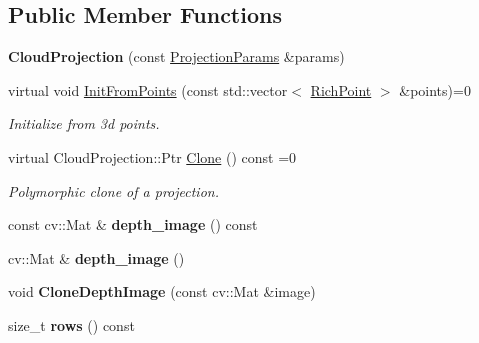 \subsection*{Public Member Functions}
\begin{DoxyCompactItemize}
\item 
\hypertarget{classdepth__clustering_1_1CloudProjection_a7abfd6e56bacd684379916af2ab60cef}{{\bfseries Cloud\-Projection} (const \hyperlink{classdepth__clustering_1_1ProjectionParams}{Projection\-Params} \&params)}\label{classdepth__clustering_1_1CloudProjection_a7abfd6e56bacd684379916af2ab60cef}

\item 
virtual void \hyperlink{classdepth__clustering_1_1CloudProjection_ad262ef9f4e0c9c7fab9cc37874ca72eb}{Init\-From\-Points} (const std\-::vector$<$ \hyperlink{classdepth__clustering_1_1RichPoint}{Rich\-Point} $>$ \&points)=0
\begin{DoxyCompactList}\small\item\em Initialize from 3d points. \end{DoxyCompactList}\item 
virtual Cloud\-Projection\-::\-Ptr \hyperlink{classdepth__clustering_1_1CloudProjection_ae06ff9699c1a37c535b39fa6f722fa2e}{Clone} () const =0
\begin{DoxyCompactList}\small\item\em Polymorphic clone of a projection. \end{DoxyCompactList}\item 
\hypertarget{classdepth__clustering_1_1CloudProjection_a5519c93050ed140d8baace3a625fd9ed}{const cv\-::\-Mat \& {\bfseries depth\-\_\-image} () const }\label{classdepth__clustering_1_1CloudProjection_a5519c93050ed140d8baace3a625fd9ed}

\item 
\hypertarget{classdepth__clustering_1_1CloudProjection_aa04e09c527c7e1bc1b5ab161c5931b30}{cv\-::\-Mat \& {\bfseries depth\-\_\-image} ()}\label{classdepth__clustering_1_1CloudProjection_aa04e09c527c7e1bc1b5ab161c5931b30}

\item 
\hypertarget{classdepth__clustering_1_1CloudProjection_a3e28dfda41fa497bfd54fe3c7f2a9b37}{void {\bfseries Clone\-Depth\-Image} (const cv\-::\-Mat \&image)}\label{classdepth__clustering_1_1CloudProjection_a3e28dfda41fa497bfd54fe3c7f2a9b37}

\item 
\hypertarget{classdepth__clustering_1_1CloudProjection_a41fe972471286f13a15167860a0d6fce}{size\-\_\-t {\bfseries rows} () const }\label{classdepth__clustering_1_1CloudProjection_a41fe972471286f13a15167860a0d6fce}


\end{DoxyCompactItemize}
